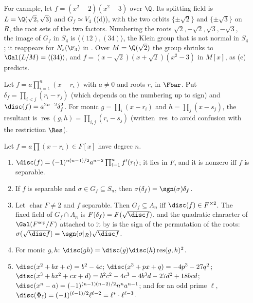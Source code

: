 For example, let $f=(x^2-2)(x^2-3)$ over $\Q$. Its splitting field is $L=\Q(\sqrt2,\sqrt3)$ and $G_f\simeq V_4$ ((d)), with the two
orbits $\{\pm\sqrt2\}$ and $\{\pm\sqrt3\}$ on $R$, the root sets of the two factors. Numbering the roots $\sqrt2,-\sqrt2,\sqrt3,-\sqrt3$, the image of $G_f$ in $S_4$ is
$\langle(12),(34)\rangle$, the Klein group that is not normal in $S_4$; it reappears for $N_s(\F_3)$ in . Over $M=\Q(\sqrt2)$ the group
shrinks to $\Gal(L/M)=\langle(34)\rangle$, and $f=(x-\sqrt2)(x+\sqrt2)(x^2-3)$ in $M[x]$, as (c) predicts.

\begin{definition}[Discriminant]\label{def:galois:discriminant}
Let $f=a\prod_{i=1}^n(x-r_i)$ with $a\ne0$ and roots $r_i$ in $\Fbar$. Put $\delta_f=\prod_{i<j}(r_i-r_j)$ (which depends on the numbering up to sign) and
$\disc(f)=a^{2n-2}\delta_f^2$. For monic $g=\prod_i(x-r_i)$ and $h=\prod_j(x-s_j)$, the resultant is $\operatorname{res}(g,h)=\prod_{i,j}(r_i-s_j)$ (written
$\operatorname{res}$ to avoid confusion with the restriction $\Res$).
\end{definition}

\begin{proposition}[Discriminants]\label{prop:galois:discriminant}
Let $f=a\prod(x-r_i)\in F[x]$ have degree $n$.
\begin{enumerate}[label=(\alph*)]
\item $\disc(f)=(-1)^{n(n-1)/2}a^{n-2}\prod_{i=1}^nf'(r_i)$; it lies in $F$, and it is nonzero iff $f$ is separable.
\item If $f$ is separable and $\sigma\in G_f\subseteq S_n$, then $\sigma(\delta_f)=\sgn(\sigma)\delta_f$.
\item Let $\operatorname{char}F\ne2$ and $f$ separable. Then $G_f\subseteq A_n$ iff $\disc(f)\in F^{\times2}$. The fixed field of $G_f\cap A_n$ is
$F(\delta_f)=F(\sqrt{\disc f})$, and the quadratic character of $\Gal(F^{\mathrm{sep}}/F)$ attached to it by  is the sign of the
permutation of the roots: $\sigma(\sqrt{\disc f})=\sgn(\sigma|_R)\sqrt{\disc f}$.
\item For monic $g,h$: $\disc(gh)=\disc(g)\disc(h)\operatorname{res}(g,h)^2$.
\item $\disc(x^2+bx+c)=b^2-4c$; $\disc(x^3+px+q)=-4p^3-27q^2$; $\disc(x^3+bx^2+cx+d)=b^2c^2-4c^3-4b^3d-27d^2+18bcd$;
$\disc(x^n-a)=(-1)^{(n-1)(n-2)/2}n^na^{n-1}$; and for an odd prime $\ell$, $\disc(\Phi_\ell)=(-1)^{(\ell-1)/2}\ell^{\ell-2}=\ell^*\cdot\ell^{\ell-3}$.
\end{enumerate}
\end{proposition}

